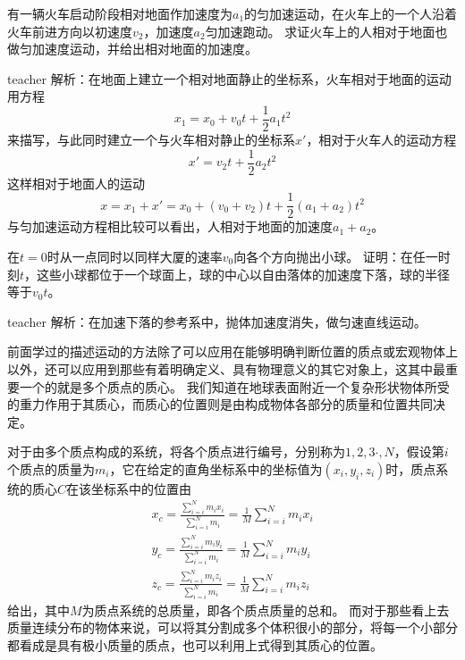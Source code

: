 \begin{example}
有一辆火车启动阶段相对地面作加速度为$a_1$的匀加速运动，在火车上的一个人沿着火车前进方向以初速度$v_2$，加速度$a_2$匀加速跑动。
求证火车上的人相对于地面也做匀加速度运动，并给出相对地面的加速度。
\begin{taggedblock}{teacher}
\newline
解析：在地面上建立一个相对地面静止的坐标系，火车相对于地面的运动用方程
\[ x_1=x_0+v_0t+ \frac{1}{2}a_1t^2 \]
来描写，与此同时建立一个与火车相对静止的坐标系$x'$，相对于火车人的运动方程
\[ x' = v_2t +\frac{1}{2}a_2t^2 \]
这样相对于地面人的运动
\[x =x_1+x' = x_0+(v_0+v_2)t+\frac{1}{2}(a_1+a_2)t^2 \]
与匀加速运动方程相比较可以看出，人相对于地面的加速度$a_1+a_2$。
\end{taggedblock}
\end{example}

\begin{example}
在$t=0$时从一点同时以同样大厦的速率$v_0$向各个方向抛出小球。
证明：在任一时刻$t$，这些小球都位于一个球面上，球的中心以自由落体的加速度下落，球的半径等于$v_0t$。
\begin{taggedblock}{teacher}
\newline
解析：在加速下落的参考系中，抛体加速度消失，做匀速直线运动。
\end{taggedblock}
\end{example}


前面学过的描述运动的方法除了可以应用在能够明确判断位置的质点或宏观物体上以外，还可以应用到那些有着明确定义、具有物理意义的其它对象上，这其中最重要一个的就是多个质点的质心。
我们知道在地球表面附近一个复杂形状物体所受的重力作用于其质心，而质心的位置则是由构成物体各部分的质量和位置共同决定。

对于由多个质点构成的系统，将各个质点进行编号，分别称为$1,2,3\cdot , N$，假设第$i$个质点的质量为$m_i$，它在给定的直角坐标系中的坐标值为$(x_i,y_i,z_i)$时，质点系统的质心$C$在该坐标系中的位置由
\begin{eqnarray}
x_c = \frac{\sum_{i=i}^{N}m_ix_i}{\sum_{i=i}^{N}m_i} =\frac{1}{M} \sum_{i=i}^{N}m_ix_i\nonumber\\
y_c = \frac{\sum_{i=i}^{N}m_iy_i}{\sum_{i=i}^{N}m_i}=\frac{1}{M} \sum_{i=i}^{N}m_iy_i\nonumber\\
z_c = \frac{\sum_{i=i}^{N}m_iz_i}{\sum_{i=i}^{N}m_i}=\frac{1}{M} \sum_{i=i}^{N}m_iz_i
\end{eqnarray}
给出，其中$M$为质点系统的总质量，即各个质点质量的总和。
而对于那些看上去质量连续分布的物体来说，可以将其分割成多个体积很小的部分，将每一个小部分都看成是具有极小质量的质点，也可以利用上式得到其质心的位置。

